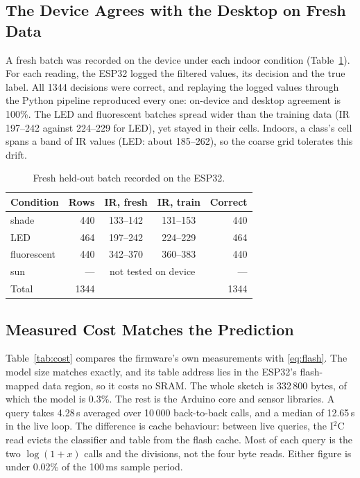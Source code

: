 \documentclass[conference]{IEEEtran}
\begin{document}
\subsection{The Device Agrees with the Desktop on Fresh Data}
A fresh batch was recorded on the device under each indoor condition (Table~\ref{tab:heldout}). For each reading, the ESP32 logged the filtered values, its decision and the true label. All 1344 decisions were correct, and replaying the logged values through the Python pipeline reproduced every one: on-device and desktop agreement is 100\%. The LED and fluorescent batches spread wider than the training data (IR 197--242 against 224--229 for LED), yet stayed in their cells. Indoors, a class's cell spans a band of IR values (LED: about 185--262), so the coarse grid tolerates this drift.

\begin{table}[!bt]
\centering
\caption{Fresh held-out batch recorded on the ESP32.}
\label{tab:heldout}
\small\setlength{\tabcolsep}{4pt}
\begin{tabularx}{\linewidth}{@{}X r c c r@{}}
\toprule
Condition & Rows & IR, fresh & IR, train & Correct \\
\midrule
shade       & 440 & 133--142 & 131--153 & 440 \\
LED         & 464 & 197--242 & 224--229 & 464 \\
fluorescent & 440 & 342--370 & 360--383 & 440 \\
sun         & --- & \multicolumn{2}{c}{not tested on device} & --- \\
\midrule
Total       & 1344 & & & 1344 \\
\bottomrule
\end{tabularx}
\end{table}

\subsection{Measured Cost Matches the Prediction}
Table~\ref{tab:cost} compares the firmware's own measurements with \eqref{eq:flash}. The model size matches exactly, and its table address lies in the ESP32's flash-mapped data region, so it costs no SRAM. The whole sketch is 332\,800 bytes, of which the model is 0.3\%. The rest is the Arduino core and sensor libraries. A query takes 4.28\,\textmu s averaged over 10\,000 back-to-back calls, and a median of 12.65\,\textmu s in the live loop. The difference is cache behaviour: between live queries, the I$^2$C read evicts the classifier and table from the flash cache. Most of each query is the two $\log(1+x)$ calls and the divisions, not the four byte reads. Either figure is under 0.02\% of the 100\,ms sample period.
\end{document}
